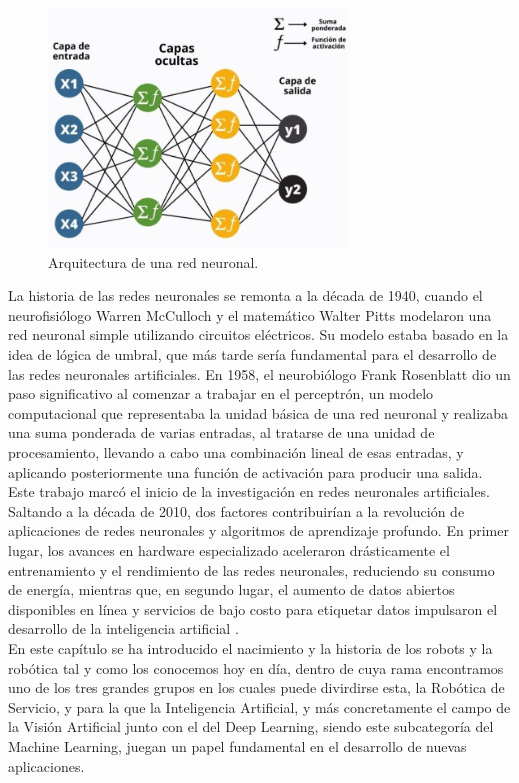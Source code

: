 \begin{figure} [h!]
    \begin{center}
      \includegraphics[width=8cm]{figs/capas rrnn.jpeg}
    \end{center}
    \caption{Arquitectura de una red neuronal.}
    \label{fig:Arquitectura red neuronal}
\end{figure}
\pagebreak

La historia de las redes neuronales se remonta a la década de 1940, cuando el neurofisiólogo Warren McCulloch y el matemático Walter Pitts modelaron una red neuronal simple utilizando circuitos eléctricos. Su modelo estaba basado en la idea de lógica de umbral, que más tarde sería fundamental para el desarrollo de las redes neuronales artificiales. En 1958, el neurobiólogo Frank Rosenblatt dio un paso significativo al comenzar a trabajar en el perceptrón, un modelo computacional que representaba la unidad básica de una red neuronal y realizaba una suma ponderada de varias entradas, al tratarse de una unidad de procesamiento, llevando a cabo una combinación lineal de esas entradas, y aplicando posteriormente una función de activación para producir una salida. Este trabajo marcó el inicio de la investigación en redes neuronales artificiales. Saltando a la década de 2010, dos factores contribuirían a la revolución de aplicaciones de redes neuronales y algoritmos de aprendizaje profundo. En primer lugar, los avances en hardware especializado aceleraron drásticamente el entrenamiento y el rendimiento de las redes neuronales, reduciendo su consumo de energía, mientras que, en segundo lugar, el aumento de datos abiertos disponibles en línea y servicios de bajo costo para etiquetar datos impulsaron el desarrollo de la inteligencia artificial \cite{Abeliuk21}.\\

En este capítulo se ha introducido el nacimiento y la historia de los robots y la robótica tal y como los conocemos hoy en día, dentro de cuya rama encontramos uno de los tres grandes grupos en los cuales puede divirdirse esta, la Robótica de Servicio, y para la que la Inteligencia Artificial, y más concretamente el campo de la Visión Artificial junto con el del Deep Learning, siendo este subcategoría del Machine Learning, juegan un papel fundamental en el desarrollo de nuevas aplicaciones.\\

